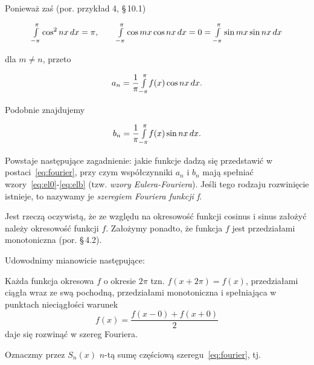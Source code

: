 \documentclass[leqno]{book}
\newcommand{\normalsign}[1]{{\normalfont{#1}}}
\newcommand{\parsign}[0]{\S\,}
\begin{document}
    Ponieważ zaś (por. przykład 4, \parsign 10.1)

    \[
        \mathsmaller{\int\limits_{-\pi}^{\pi}} \cos^2 nx \,dx = \pi, \qquad
        \mathsmaller{\int\limits_{-\pi}^{\pi}} \cos mx \cos nx \,dx = 0 = \mathsmaller{\int\limits_{-\pi}^{\pi}} \sin mx \sin nx \,dx
    \]

    \noindent
    dla $m \neq n$, przeto

    \begin{equation}
        \label{eq:ela}
        a_n = \frac{1}{\pi} \mathsmaller{\int\limits_{-\pi}^{\pi}} f(x) \cos nx \,dx \text{.}
    \end{equation}

    Podobnie znajdujemy

    \begin{equation}
        \label{eq:elb}
        b_n = \frac{1}{\pi} \mathsmaller{\int\limits_{-\pi}^{\pi}} f(x) \sin nx \,dx \text{.}
    \end{equation}

    Powstaje następujące zagadnienie: jakie funkcje dadzą się przedstawić w postaci~\eqref{eq:fourier}, przy czym współczynniki $a_n$ i $b_n$ mają
    spełniać wzory~\eqref{eq:el0}-\eqref{eq:elb} (tzw. \textit{wzory Eulera-Fouriera}).
    Jeśli tego rodzaju rozwinięcie istnieje, to nazywamy je \textit{szeregiem Fouriera funkcji f}.

    Jest rzeczą oczywistą, że ze względu na okresowość funkcji cosinus i sinus założyć należy okresowość funkcji $f$.
    Założymy ponadto, że funkcja $f$ jest przedziałami monotoniczna (por. \parsign 4.2).

    Udowodnimy mianowicie następujące:

    \begin{twierdzenie}
        Każda funkcja okresowa $f$ o okresie $2\pi$ \normalsign{(}tzn. $f(x + 2\pi) = f(x)$\normalsign{)}, przedziałami ciągła
        \normalsign{(}wraz ze swą pochodną\normalsign{)}, przedziałami monotoniczna i spełniająca
        \normalsign{(}w punktach nieciągłości\normalsign{)} warunek
        \begin{equation}
            \label{eq:statement}
            f(x) = \frac{f(x - 0) + f(x + 0)}{2}
        \end{equation}
        daje się rozwinąć w szereg Fouriera.
    \end{twierdzenie}

    Oznaczmy przez $S_n (x)$ $n$-tą sumę częściową szeregu~\eqref{eq:fourier}, tj.
\end{document}
